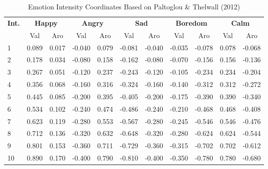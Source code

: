 \begin{table}[H]
    \centering
    \caption{Emotion Intensity Coordinates Based on Paltoglou \& Thelwall (2012)}
    \begin{tabular}{p{0.8cm}|cc|cc|cc|cc|cc}
    
    \textbf{Int.} & \multicolumn{2}{c|}{\textbf{Happy}} & \multicolumn{2}{c|}{\textbf{Angry}} & \multicolumn{2}{c|}{\textbf{Sad}} & \multicolumn{2}{c|}{\textbf{Boredom}} & \multicolumn{2}{c}{\textbf{Calm}} \\
    
    & Val & Aro & Val & Aro & Val & Aro & Val & Aro & Val & Aro \\
    \hline
    1 & 0.089 & 0.017 & -0.040 & 0.079 & -0.081 & -0.040 & -0.035 & -0.078 & 0.078 & -0.068 \\
    2 & 0.178 & 0.034 & -0.080 & 0.158 & -0.162 & -0.080 & -0.070 & -0.156 & 0.156 & -0.136 \\
    3 & 0.267 & 0.051 & -0.120 & 0.237 & -0.243 & -0.120 & -0.105 & -0.234 & 0.234 & -0.204 \\
    4 & 0.356 & 0.068 & -0.160 & 0.316 & -0.324 & -0.160 & -0.140 & -0.312 & 0.312 & -0.272 \\
    5 & 0.445 & 0.085 & -0.200 & 0.395 & -0.405 & -0.200 & -0.175 & -0.390 & 0.390 & -0.340 \\
    6 & 0.534 & 0.102 & -0.240 & 0.474 & -0.486 & -0.240 & -0.210 & -0.468 & 0.468 & -0.408 \\
    7 & 0.623 & 0.119 & -0.280 & 0.553 & -0.567 & -0.280 & -0.245 & -0.546 & 0.546 & -0.476 \\
    8 & 0.712 & 0.136 & -0.320 & 0.632 & -0.648 & -0.320 & -0.280 & -0.624 & 0.624 & -0.544 \\
    9 & 0.801 & 0.153 & -0.360 & 0.711 & -0.729 & -0.360 & -0.315 & -0.702 & 0.702 & -0.612 \\
    10 & 0.890 & 0.170 & -0.400 & 0.790 & -0.810 & -0.400 & -0.350 & -0.780 & 0.780 & -0.680 \\
    
    \end{tabular}
    \label{tab:emotion_coordinates}
\end{table}